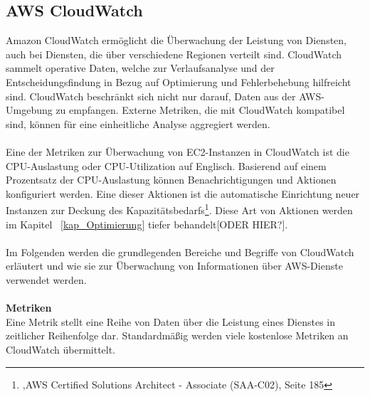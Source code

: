 \subsection{AWS CloudWatch}
Amazon CloudWatch ermöglicht die Überwachung der Leistung von Diensten, auch bei Diensten, die über verschiedene Regionen verteilt sind. CloudWatch sammelt operative Daten, welche zur Verlaufsanalyse und der Entscheidungsfindung in Bezug auf Optimierung und Fehlerbehebung hilfreicht sind. CloudWatch beschränkt sich nicht nur darauf, Daten aus der AWS-Umgebung zu empfangen. Externe Metriken, die mit CloudWatch kompatibel sind, können für eine einheitliche Analyse aggregiert werden. 
\\\\
Eine der Metriken zur Überwachung von EC2-Instanzen in CloudWatch ist die CPU-Auslastung oder CPU-Utilization auf Englisch. Basierend auf einem Prozentsatz der CPU-Auslastung können Benachrichtigungen und Aktionen konfiguriert werden. Eine dieser Aktionen ist die automatische Einrichtung neuer Instanzen zur Deckung des Kapazitätsbedarfs\footnote{\cite{AWS1},AWS Certified Solutions Architect - Associate (SAA-C02), Seite 185}. Diese Art von Aktionen werden im Kapitel ~\ref{kap_Optimierung} tiefer behandelt[ODER HIER?].
\\\\
Im Folgenden werden die grundlegenden Bereiche und Begriffe von CloudWatch erläutert und wie sie zur Überwachung von Informationen über AWS-Dienste verwendet werden.
\\\\
\textbf{Metriken} \\
Eine Metrik stellt eine Reihe von Daten über die Leistung eines Dienstes in zeitlicher Reihenfolge dar. Standardmäßig werden viele kostenlose Metriken an CloudWatch übermittelt.

